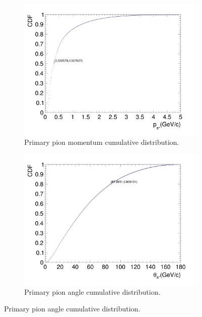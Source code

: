           \begin{figure}[t]
               \centering
               \begin{subfigure}{\dbfigwid\textwidth}
                    \includegraphics[width=\textwidth]{figures/sel/inclusive_pion_mom_CDF_0.5.png}
                    \caption{Primary pion momentum cumulative distribution.}
                    \label{subfig:pi-mom-cum}
               \end{subfigure}
               \begin{subfigure}{\dbfigwid\textwidth}
                    \includegraphics[width=\textwidth]{figures/sel/inclusive_pion_theta_CDF_0.8.png}
                    \caption{Primary pion angle cumulative distribution.}
                    \label{subfig:pi-theta-cum}
               \end{subfigure}
          \end{figure}
               
